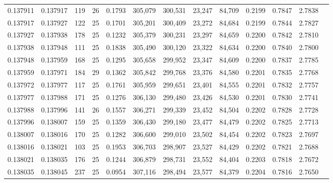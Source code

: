 \begin{tabular}{rrrrrrrrrrrrr}
0.137911 & 0.137917 &   119 &  26 &                                     0.1793 & 305,079 & 300,531 &  23,247 &  84,709 & 0.2199 & 0.7847 & 2.7838 \\
0.137917 & 0.137927 &   122 &  25 &                                     0.1701 & 305,201 & 300,409 &  23,272 &  84,684 & 0.2199 & 0.7844 & 2.7827 \\
0.137927 & 0.137938 &   178 &  25 &                                     0.1232 & 305,379 & 300,231 &  23,297 &  84,659 & 0.2200 & 0.7842 & 2.7810 \\
0.137938 & 0.137948 &   111 &  25 &                                     0.1838 & 305,490 & 300,120 &  23,322 &  84,634 & 0.2200 & 0.7840 & 2.7800 \\
0.137948 & 0.137959 &   168 &  25 &                                     0.1295 & 305,658 & 299,952 &  23,347 &  84,609 & 0.2200 & 0.7837 & 2.7785 \\
0.137959 & 0.137971 &   184 &  29 &                                     0.1362 & 305,842 & 299,768 &  23,376 &  84,580 & 0.2201 & 0.7835 & 2.7768 \\
0.137972 & 0.137977 &   117 &  25 &                                     0.1761 & 305,959 & 299,651 &  23,401 &  84,555 & 0.2201 & 0.7832 & 2.7757 \\
0.137977 & 0.137988 &   171 &  25 &                                     0.1276 & 306,130 & 299,480 &  23,426 &  84,530 & 0.2201 & 0.7830 & 2.7741 \\
0.137988 & 0.137996 &   141 &  26 &                                     0.1557 & 306,271 & 299,339 &  23,452 &  84,504 & 0.2202 & 0.7828 & 2.7728 \\
0.137996 & 0.138007 &   159 &  25 &                                     0.1359 & 306,430 & 299,180 &  23,477 &  84,479 & 0.2202 & 0.7825 & 2.7713 \\
0.138007 & 0.138016 &   170 &  25 &                                     0.1282 & 306,600 & 299,010 &  23,502 &  84,454 & 0.2202 & 0.7823 & 2.7697 \\
0.138016 & 0.138021 &   103 &  25 &                                     0.1953 & 306,703 & 298,907 &  23,527 &  84,429 & 0.2202 & 0.7821 & 2.7688 \\
0.138021 & 0.138035 &   176 &  25 &                                     0.1244 & 306,879 & 298,731 &  23,552 &  84,404 & 0.2203 & 0.7818 & 2.7672 \\
0.138035 & 0.138045 &   237 &  25 &                                     0.0954 & 307,116 & 298,494 &  23,577 &  84,379 & 0.2204 & 0.7816 & 2.7650 \\

\end{tabular}

